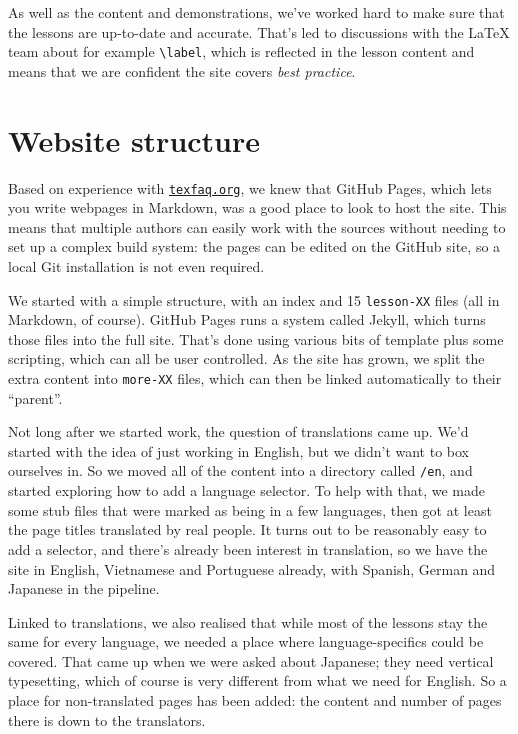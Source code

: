 \documentclass[final]{ltugboat}
\begin{document}
As well as the content and demonstrations, we've worked hard to make sure that
the lessons are up-to-date and accurate. That's led to discussions with the
\LaTeX{} team about for example \verb|\label|, which is reflected in the lesson
content and means that we are confident the site covers \emph{best practice}.

\section{Website structure}

Based on experience with \href{https://texfaq.org}{\nolinkurl{texfaq.org}}, we knew that GitHub Pages, which
lets you write webpages in Markdown, was a good place to look to host the site.
This means that multiple authors can easily work with the sources without
needing to set up a complex build system: the pages can be edited on the GitHub
site, so a local Git installation is not even required.

We started with a simple structure, with an index and 15 \texttt{lesson-XX}
files (all in Markdown, of course). GitHub Pages runs a system called Jekyll,
which turns those files into the full site. That's done using various bits of
template plus some scripting, which can all be user controlled. As the site has
grown, we split the extra content into \texttt{more-XX} files, which can then
be linked automatically to their \enquote{parent}.

Not long after we started work, the question of translations came up. We'd started
with the idea of just working in English, but we didn't want to box ourselves in.
So we moved all of the content into a directory called \texttt{/en}, and started
exploring how to add a language selector. To help with that, we made some stub
files that were marked as being in a few languages, then got at least the
page titles translated by real people. It turns out to be reasonably easy
to add a selector, and there's already been interest in translation, so
we have the site in English, Vietnamese and Portuguese already, with Spanish,
German and Japanese in the pipeline.

Linked to translations, we also realised that while most of the lessons stay
the same for every language, we needed a place where language-specifics could
be covered. That came up when we were asked about Japanese; they need vertical
typesetting, which of course is very different from what we need for English.
So a place for non-translated pages has been added: the content and number of
pages there is down to the translators.
\end{document}
